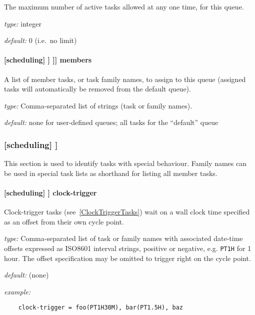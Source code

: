 The maximum number of active tasks allowed at any one time, for this queue.
\begin{myitemize}
\item {\em type:} integer
\item {\em default:} 0 (i.e.\ no limit)
\end{myitemize}

\paragraph[members]{[scheduling] \textrightarrow [[queues]] \textrightarrow [[[\_\_QUEUE\_\_]]] \textrightarrow members}

A list of member tasks, or task family names, to assign to this queue
(assigned tasks will automatically be removed from the default queue).
\begin{myitemize}
\item {\em type:} Comma-separated list of strings (task or family names).
\item {\em default:} none for user-defined queues; all tasks for the ``default'' queue
\end{myitemize}

\subsubsection[{[[}special tasks{]]}]{[scheduling] \textrightarrow [[special tasks]]}

This section is used to identify tasks with special behaviour. Family names can
be used in special task lists as shorthand for listing all member tasks.

\paragraph[clock-trigger]{[scheduling] \textrightarrow [[special tasks]] \textrightarrow clock-trigger}

Clock-trigger tasks (see~\ref{ClockTriggerTasks}) wait on a wall clock time
specified as an offset from their own cycle point.

\begin{myitemize}
    \item {\em type:} Comma-separated list of task or family names with
        associated date-time offsets expressed as ISO8601 interval strings,
        positive or negative, e.g. \lstinline=PT1H= for 1 hour.  The offset
        specification may be omitted to trigger right on the cycle point.
    \item {\em default:} (none)
    \item {\em example:}
\begin{lstlisting}
    clock-trigger = foo(PT1H30M), bar(PT1.5H), baz
\end{lstlisting}
\end{myitemize}

